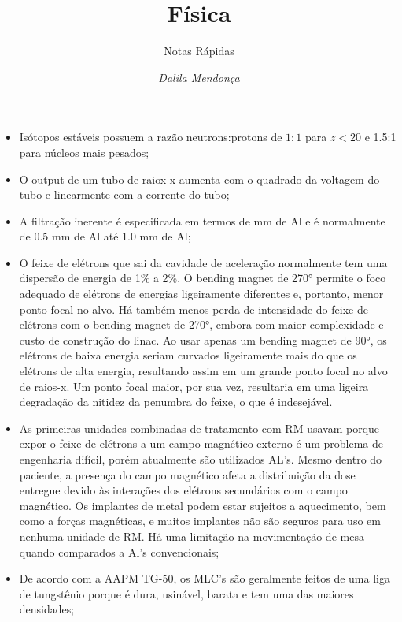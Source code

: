 \documentclass[11pt,a4paper]{article}
\title{Física}
\author{Notas Rápidas \nocite{*}}
\date{\textit{Dalila Mendonça}}
\newcounter{exemplo}
\begin{document}
	\maketitle


\begin{exemplo}[Física]

    \begin{itemize}
        \item Isótopos estáveis possuem a razão neutrons:protons de $1:1$ para $z <  20$ e 1.5:1 para núcleos mais pesados;
        
        \item O output de um tubo de raiox-x aumenta com o quadrado da voltagem do tubo  e linearmente com a corrente do tubo;
        
        \item A filtração inerente é especificada em termos de mm de Al e é normalmente de 0.5 mm de Al até 1.0 mm de Al;
        
        \item O feixe de elétrons que sai da cavidade de aceleração normalmente tem uma dispersão de energia de 1\% a 2\%. O bending magnet de \ang{270} permite o foco adequado de elétrons de energias ligeiramente diferentes e, portanto, menor ponto focal no alvo. Há também menos perda de intensidade do feixe de elétrons com o bending magnet de \ang{270}, embora com maior complexidade e custo de construção do linac. Ao usar apenas um bending magnet de \ang{90}, os elétrons de baixa energia seriam curvados ligeiramente mais do que os elétrons de alta energia, resultando assim em um grande ponto focal no alvo de raios-x. Um ponto focal maior, por sua vez, resultaria em uma ligeira degradação da nitidez da penumbra do feixe, o que é indesejável.
        
        \item As primeiras unidades combinadas de tratamento com RM usavam  porque expor o feixe de elétrons a um campo magnético externo é um problema de engenharia difícil, porém atualmente são utilizados AL's. Mesmo dentro do paciente, a presença do campo magnético afeta a distribuição da dose entregue devido às interações dos elétrons secundários com o campo magnético. Os implantes de metal podem estar sujeitos a aquecimento, bem como a forças magnéticas, e muitos implantes não são seguros para uso em nenhuma unidade de RM. Há uma limitação na movimentação de mesa quando comparados a Al's convencionais;
        
        \item De acordo com a AAPM TG-50, os MLC's são geralmente feitos de uma liga de tungstênio porque é dura, usinável, barata e tem uma das maiores densidades;
        

\end{itemize}
\end{exemplo}
\end{document}
